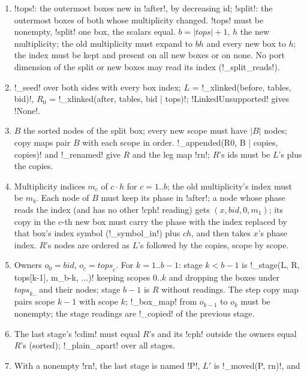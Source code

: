 {{{\begin{algorithm}\label{alg:lean-export-split}
\begin{enumerate}
\item \lexcode!tops!: the outermost boxes new in \lexcode!after!, by decreasing id; \lexcode!split!: the
outermost boxes of both whose multiplicity changed. \lexcode!tops! must be nonempty, \lexcode!split! one
box, the scalars equal. $b = |\mathit{tops}|+1$, $h$ the new multiplicity; the old multiplicity
must expand to $bh$ and every new box to $h$; the index must be kept and present on all new boxes
or on none. No port dimension of the split or new boxes may read its index (\lexpy!_split_reads!).
\item \lexpy!_seed! over both sides with every box index; $L$ = \lexpy!_xlinked(before, tables, {bid})!,
$R_0$ = \lexpy!_xlinked(after, tables, {bid} | tops)!; \lexpy!LinkedUnsupported! gives \lexpy!None!.
\item $B$ the sorted nodes of the split box; every new scope must have $|B|$ nodes; copy maps pair
$B$ with each scope in order. \lexpy!_appended(R0, B | copies, copies)! and \lexpy!_renamed! give $R$
and the leg map \lexcode!rn!; $R$'s ids must be $L$'s plus the copies.
\item Multiplicity indices $m_c$ of $c\cdot h$ for $c = 1..b$; the old multiplicity's index must be
$m_b$. Each node of $B$ must keep its phase in \lexcode!after!; a node whose phase reads the index
(and has no other \lexcode!cph! reading) gets $(x, \mathit{bid}, 0, m_1)$; its copy in the $c$-th new
box must carry the phase with the index replaced by that box's index symbol (\lexpy!_symbol_in!)
plus $c h$, and then takes $x$'s phase index. $R$'s nodes are ordered as $L$'s followed by the
copies, scope by scope.
\item Owners $o_0 = \mathit{bid}$, $o_c = \mathit{tops}_c$. For $k = 1..b-1$: stage $k < b-1$ is
\lexpy!_stage(L, R, tops[k-1], m_{b-k}, ...)! keeping scopes $0..k$ and dropping the boxes under
$\mathit{tops}_{k..}$ and their nodes; stage $b-1$ is $R$ without readings. The step copy map
pairs scope $k-1$ with scope $k$; \lexpy!_box_map! from $o_{k-1}$ to $o_k$ must be nonempty; the
stage readings are \lexpy!_copied! of the previous stage.
\item The last stage's \lexcode!cdim! must equal $R$'s and its \lexcode!cph! outside the owners equal
$R$'s (sorted); \lexpy!_plain_apart! over all stages.
\item With a nonempty \lexcode!rn!, the last stage is named \lexlean!P!, $L'$ is \lexpy!_moved(P, rn)!, and

\end{enumerate}
\end{algorithm}}}}

